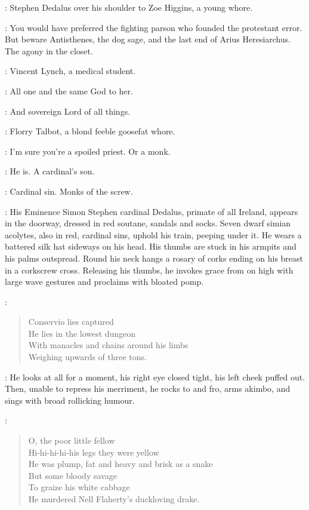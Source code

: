 
:
Stephen Dedalus over his shoulder to Zoe Higgins, a young whore.

\Stephen:
You would have preferred the fighting parson who founded the protestant error.
But beware Antisthenes, the dog sage, and the last end of Arius Heresiarchus.
The agony in the closet.

:
Vincent Lynch, a medical student.

\Lynch:
All one and the same God to her.

\Stephen:
And sovereign Lord of all things.

:
Florry Talbot, a blond feeble goosefat whore.

\Florry:
I'm sure you're a spoiled priest.
Or a monk.

\Lynch:
He is.
A cardinal's son.

\Stephen:
Cardinal sin.
Monks of the screw.

:
His Eminence Simon Stephen cardinal Dedalus, primate of all Ireland,
appears in the doorway, dressed in red soutane, sandals and socks.
Seven dwarf simian acolytes, also in red, cardinal sins,
uphold his train, peeping under it.
He wears a battered silk hat sideways on his head.
His thumbs are stuck in his armpits and his palms outspread.
Round his neck hangs a rosary of corks ending on his breast in a corkscrew cross.
Releasing his thumbs, he invokes grace from on high with large wave gestures
and proclaims with bloated pomp.

\Cardinal:
\begin{verse}
    Conservio lies captured\\
    He lies in the lowest dungeon\\
    With manacles and chains around his limbs\\
    Weighing upwards of three tons.
\end{verse}

:
He looks at all for a moment, his right eye closed tight, his left cheek puffed out.
Then, unable to repress his merriment, he rocks to and fro,
arms akimbo, and sings with broad rollicking humour.

\Cardinal:
\begin{verse}
    O, the poor little fellow\\
    Hi-hi-hi-hi-his legs they were yellow\\
    He was plump, fat and heavy and brisk as a snake\\
    But some bloody savage\\
    To graize his white cabbage\\
    He murdered Nell Flaherty's duckloving drake.
\end{verse}

